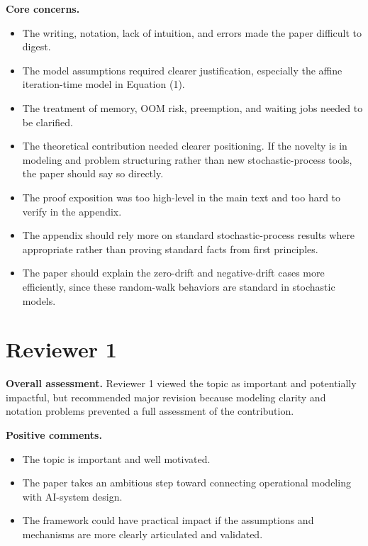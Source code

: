 \documentclass[11pt]{article}
\begin{document}
\textbf{Core concerns.}
\begin{itemize}
    \item The writing, notation, lack of intuition, and errors made the paper difficult to digest.
    \item The model assumptions required clearer justification, especially the affine iteration-time model in Equation (1).
    \item The treatment of memory, OOM risk, preemption, and waiting jobs needed to be clarified.
    \item The theoretical contribution needed clearer positioning. If the novelty is in modeling and problem structuring rather than new stochastic-process tools, the paper should say so directly.
    \item The proof exposition was too high-level in the main text and too hard to verify in the appendix.
    \item The appendix should rely more on standard stochastic-process results where appropriate rather than proving standard facts from first principles.
    \item The paper should explain the zero-drift and negative-drift cases more efficiently, since these random-walk behaviors are standard in stochastic models.
\end{itemize}

\section*{Reviewer 1}

\textbf{Overall assessment.} Reviewer 1 viewed the topic as important and potentially impactful, but recommended major revision because modeling clarity and notation problems prevented a full assessment of the contribution.

\textbf{Positive comments.}
\begin{itemize}
    \item The topic is important and well motivated.
    \item The paper takes an ambitious step toward connecting operational modeling with AI-system design.
    \item The framework could have practical impact if the assumptions and mechanisms are more clearly articulated and validated.
\end{itemize}
\end{document}
